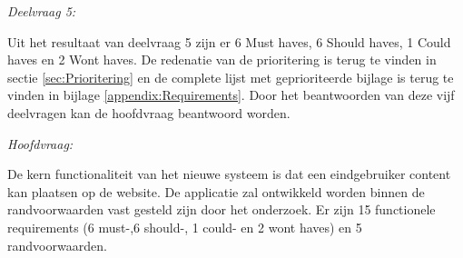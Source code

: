 \begin{center}
	\textit{Deelvraag 5: \SubquestionFive}
\end{center}

\whitespace
Uit het resultaat van deelvraag 5 zijn er 6 Must haves, 6 Should haves, 1 Could haves en 2 Wont haves.
De redenatie van de prioritering is terug te vinden in sectie \ref{sec:Prioritering} en de complete lijst met geprioriteerde bijlage is terug te vinden in bijlage \ref{appendix:Requirements}.
Door het beantwoorden van deze vijf deelvragen kan de hoofdvraag beantwoord worden.

\begin{center}
	\textit{Hoofdvraag: \MainQuestion}
\end{center}

\whitespace
De kern functionaliteit van het nieuwe systeem is dat een eindgebruiker content kan plaatsen op de website.
De applicatie zal ontwikkeld worden binnen de randvoorwaarden vast gesteld zijn door het onderzoek.
Er zijn 15 functionele requirements (6 must-,6 should-, 1 could- en 2 wont haves) en 5 randvoorwaarden.


